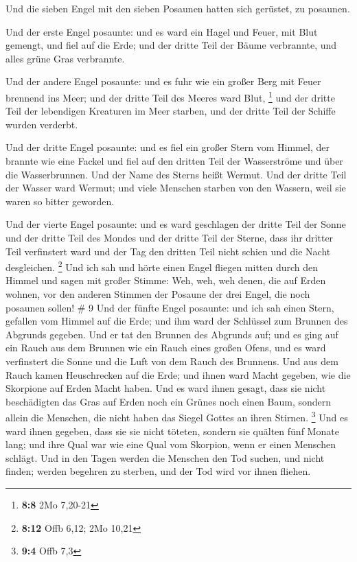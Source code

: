  Und die sieben Engel mit den sieben Posaunen hatten sich
gerüstet, zu posaunen.

 Und der erste Engel posaunte: und es ward ein Hagel und
Feuer, mit Blut gemengt, und fiel auf die Erde; und der dritte Teil der
Bäume verbrannte, und alles grüne Gras verbrannte.

 Und der andere Engel posaunte: und es fuhr wie ein großer
Berg mit Feuer brennend ins Meer; und der dritte Teil des Meeres ward
Blut, \footnote{\textbf{8:8} 2Mo 7,20-21}  und der dritte
Teil der lebendigen Kreaturen im Meer starben, und der dritte Teil der
Schiffe wurden verderbt.

 Und der dritte Engel posaunte: und es fiel ein großer
Stern vom Himmel, der brannte wie eine Fackel und fiel auf den dritten
Teil der Wasserströme und über die Wasserbrunnen.  Und der
Name des Sterns heißt Wermut. Und der dritte Teil der Wasser ward
Wermut; und viele Menschen starben von den Wassern, weil sie waren so
bitter geworden.

 Und der vierte Engel posaunte: und es ward geschlagen der
dritte Teil der Sonne und der dritte Teil des Mondes und der dritte Teil
der Sterne, dass ihr dritter Teil verfinstert ward und der Tag den
dritten Teil nicht schien und die Nacht desgleichen. \footnote{\textbf{8:12}
  Offb 6,12; 2Mo 10,21}  Und ich sah und hörte einen Engel
fliegen mitten durch den Himmel und sagen mit großer Stimme: Weh, weh,
weh denen, die auf Erden wohnen, vor den anderen Stimmen der Posaune der
drei Engel, die noch posaunen sollen! \# 9  Und der fünfte
Engel posaunte: und ich sah einen Stern, gefallen vom Himmel auf die
Erde; und ihm ward der Schlüssel zum Brunnen des Abgrunds gegeben.
 Und er tat den Brunnen des Abgrunds auf; und es ging auf
ein Rauch aus dem Brunnen wie ein Rauch eines großen Ofens, und es ward
verfinstert die Sonne und die Luft von dem Rauch des Brunnens.
 Und aus dem Rauch kamen Heuschrecken auf die Erde; und
ihnen ward Macht gegeben, wie die Skorpione auf Erden Macht haben.
 Und es ward ihnen gesagt, dass sie nicht beschädigten das
Gras auf Erden noch ein Grünes noch einen Baum, sondern allein die
Menschen, die nicht haben das Siegel Gottes an ihren Stirnen.
\footnote{\textbf{9:4} Offb 7,3}  Und es ward ihnen gegeben,
dass sie sie nicht töteten, sondern sie quälten fünf Monate lang; und
ihre Qual war wie eine Qual vom Skorpion, wenn er einen Menschen
schlägt.  Und in den Tagen werden die Menschen den Tod
suchen, und nicht finden; werden begehren zu sterben, und der Tod wird
vor ihnen fliehen.


